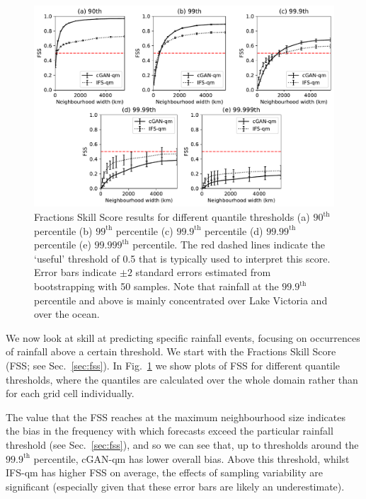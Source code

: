 \documentclass{article}
\begin{document}
\begin{figure}[t]
    \centering\includegraphics[width=\textwidth]{images/fss_final-nologs_217600.pdf}
     \caption{Fractions Skill Score results for different quantile thresholds (a) $90^{\text{th}}$ percentile (b) $99^{\text{th}}$ percentile (c) $99.9^{\text{th}}$ percentile (d) $99.99^{\text{th}}$ percentile (e) $99.999^{\text{th}}$ percentile. The red dashed lines indicate the `useful' threshold of 0.5 that is typically used to interpret this score. Error bars indicate $\pm2$ standard errors estimated from bootstrapping with 50 samples. Note that rainfall at the $99.9^{\text{th}}$ percentile and above is mainly concentrated over Lake Victoria and over the ocean. }
     \label{fig:fss}
\end{figure}

We now look at skill at predicting specific rainfall events, focusing on occurrences of rainfall above a certain threshold. We start with the Fractions Skill Score (FSS; see Sec.~\ref{sec:fss}). In Fig.~\ref{fig:fss} we show plots of FSS for different quantile thresholds, where the quantiles are calculated over the whole domain rather than for each grid cell individually.

The value that the FSS reaches at the maximum neighbourhood size indicates the bias in the frequency with which forecasts exceed the particular rainfall threshold (see Sec.~\ref{sec:fss}), and so we can see that, up to thresholds around the $99.9^{\text{th}}$ percentile, cGAN-qm has lower overall bias. Above this threshold, whilst IFS-qm has higher FSS on average, the effects of sampling variability are significant (especially given that these error bars are likely an underestimate). 
\end{document}

